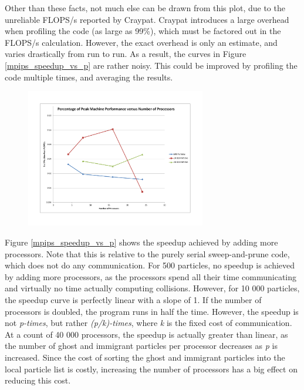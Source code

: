 \documentclass[11pt]{article} %
\begin{document}
Other than these facts, not much else can be drawn from this plot, due to the unreliable FLOPS/s reported by Craypat. Craypat introduces a large overhead when profiling the code (as large as 99\%), which must be factored out in the FLOPS/s calculation. However, the exact overhead is only an estimate, and varies drastically from run to run. As a result, the curves in Figure \ref{mpips_speedup_vs_p} are rather noisy. This could be improved by profiling the code multiple times, and averaging the results.

\begin{figure}[!h]
\centering
\includegraphics*[width=0.7\textwidth, viewport= 70 70 730 550]{figures/mpips_flops_vs_p}
\caption{}
\label{mpips_flops_vs_p}
\end{figure}

Figure \ref{mpips_speedup_vs_p} shows the speedup achieved by adding more processors. Note that this is relative to the purely serial sweep-and-prune code, which does not do any communication. For 500 particles, no speedup is achieved by adding more processors, as the processors spend all their time communicating and virtually no time actually computing collisions. However, for 10 000 particles, the speedup curve is perfectly linear with a slope of 1. If the number of processors is doubled, the program runs in half the time. However, the speedup is not {\em p-times}, but rather {\em (p/k)-times}, where {\em k} is the fixed cost of communication. At a count of 40 000 processors, the speedup is actually greater than linear, as the number of ghost and immigrant particles per processor decreases as {\em p} is increased. Since the cost of sorting the ghost and immigrant particles into the local particle list is costly, increasing the number of processors has a big effect on reducing this cost.
\end{document}
